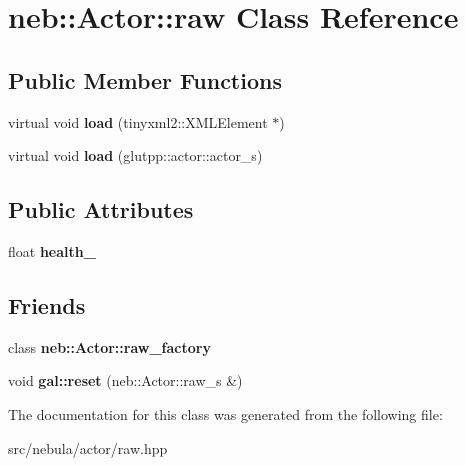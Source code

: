 \hypertarget{classneb_1_1Actor_1_1raw}{\section{neb\-:\-:\-Actor\-:\-:raw \-Class \-Reference}
\label{classneb_1_1Actor_1_1raw}
}
\subsection*{\-Public \-Member \-Functions}
\begin{DoxyCompactItemize}
\item 
\hypertarget{classneb_1_1Actor_1_1raw_a7940b6e04d8edb718757d763635ded88}{virtual void {\bfseries load} (tinyxml2\-::\-X\-M\-L\-Element $\ast$)}\label{classneb_1_1Actor_1_1raw_a7940b6e04d8edb718757d763635ded88}

\item 
\hypertarget{classneb_1_1Actor_1_1raw_a2c77b67b8525fd5ead9966c1e00b58aa}{virtual void {\bfseries load} (glutpp\-::actor\-::actor\-\_\-s)}\label{classneb_1_1Actor_1_1raw_a2c77b67b8525fd5ead9966c1e00b58aa}

\end{DoxyCompactItemize}
\subsection*{\-Public \-Attributes}
\begin{DoxyCompactItemize}
\item 
\hypertarget{classneb_1_1Actor_1_1raw_af2cd08be96aafc52e7c43c588cd7bddf}{float {\bfseries health\-\_\-}}\label{classneb_1_1Actor_1_1raw_af2cd08be96aafc52e7c43c588cd7bddf}

\end{DoxyCompactItemize}
\subsection*{\-Friends}
\begin{DoxyCompactItemize}
\item 
\hypertarget{classneb_1_1Actor_1_1raw_ae5367c8b565cf6a910d5822eab22d2d9}{class {\bfseries neb\-::\-Actor\-::raw\-\_\-factory}}\label{classneb_1_1Actor_1_1raw_ae5367c8b565cf6a910d5822eab22d2d9}

\item 
\hypertarget{classneb_1_1Actor_1_1raw_a89c753bf1646b22d579368032648a476}{void {\bfseries gal\-::reset} (neb\-::\-Actor\-::raw\-\_\-s \&)}\label{classneb_1_1Actor_1_1raw_a89c753bf1646b22d579368032648a476}

\end{DoxyCompactItemize}


\-The documentation for this class was generated from the following file\-:\begin{DoxyCompactItemize}
\item 
src/nebula/actor/raw.\-hpp\end{DoxyCompactItemize}
